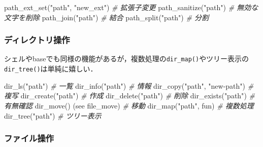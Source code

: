\documentclass[
]{article}
\newenvironment{Shaded}{\begin{snugshade}}{\end{snugshade}}
\newcommand{\CommentTok}[1]{\textcolor[rgb]{0.56,0.35,0.01}{\textit{#1}}}
\newcommand{\FunctionTok}[1]{\textcolor[rgb]{0.00,0.00,0.00}{#1}}
\newcommand{\NormalTok}[1]{#1}
\newcommand{\StringTok}[1]{\textcolor[rgb]{0.31,0.60,0.02}{#1}}
\begin{document}
\begin{Shaded}
\begin{Highlighting}[]
\FunctionTok{path\_ext\_set}\NormalTok{(}\StringTok{"path"}\NormalTok{, }\StringTok{"new\_ext"}\NormalTok{)                     }\CommentTok{\# 拡張子変更   }
\FunctionTok{path\_sanitize}\NormalTok{(}\StringTok{"path"}\NormalTok{)                               }\CommentTok{\# 無効な文字を削除   }
\FunctionTok{path\_join}\NormalTok{(}\StringTok{"path"}\NormalTok{)                                   }\CommentTok{\# 結合}
\FunctionTok{path\_split}\NormalTok{(}\StringTok{"path"}\NormalTok{)                                  }\CommentTok{\# 分割}
\end{Highlighting}
\end{Shaded}

\hypertarget{ux30c7ux30a3ux30ecux30afux30c8ux30eaux64cdux4f5c}{%
\subsubsection{ディレクトリ操作}\label{ux30c7ux30a3ux30ecux30afux30c8ux30eaux64cdux4f5c}}

シェルやbaseでも同様の機能があるが，複数処理の\texttt{dir\_map()}やツリー表示の\texttt{dir\_tree()}は単純に嬉しい．

\begin{Shaded}
\begin{Highlighting}[]
\FunctionTok{dir\_ls}\NormalTok{(}\StringTok{"path"}\NormalTok{)               }\CommentTok{\# 一覧   }
\FunctionTok{dir\_info}\NormalTok{(}\StringTok{"path"}\NormalTok{)             }\CommentTok{\# 情報   }
\FunctionTok{dir\_copy}\NormalTok{(}\StringTok{"path"}\NormalTok{, }\StringTok{"new{-}path"}\NormalTok{) }\CommentTok{\# 複写   }
\FunctionTok{dir\_create}\NormalTok{(}\StringTok{"path"}\NormalTok{)           }\CommentTok{\# 作成   }
\FunctionTok{dir\_delete}\NormalTok{(}\StringTok{"path"}\NormalTok{)           }\CommentTok{\# 削除   }
\FunctionTok{dir\_exists}\NormalTok{(}\StringTok{"path"}\NormalTok{)           }\CommentTok{\# 有無確認   }
\FunctionTok{dir\_move}\NormalTok{() (see file\_move)   }\CommentTok{\# 移動   }
\FunctionTok{dir\_map}\NormalTok{(}\StringTok{"path"}\NormalTok{, fun)         }\CommentTok{\# 複数処理   }
\FunctionTok{dir\_tree}\NormalTok{(}\StringTok{"path"}\NormalTok{)             }\CommentTok{\# ツリー表示   }
\end{Highlighting}
\end{Shaded}

\hypertarget{ux30d5ux30a1ux30a4ux30ebux64cdux4f5c}{%
\subsubsection{ファイル操作}\label{ux30d5ux30a1ux30a4ux30ebux64cdux4f5c}}
\end{document}
